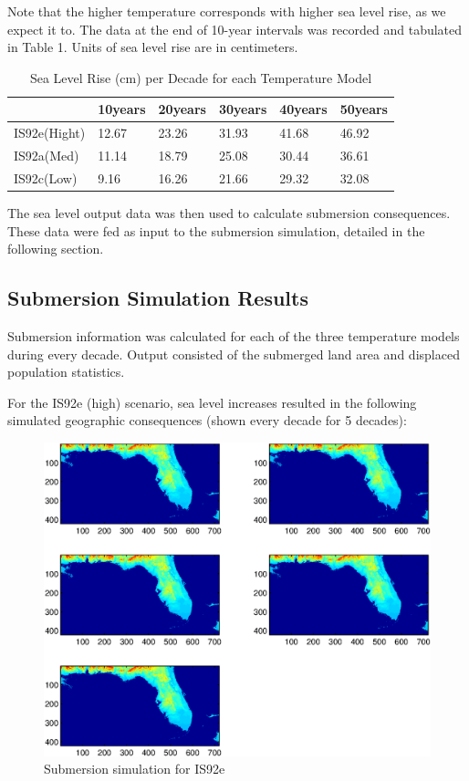\documentclass[12pt,a4paper,titlepage]{article}
\begin{document}
Note that the higher temperature corresponds with higher sea level
rise, as we expect it to. The data at the end of 10-year intervals
was recorded and tabulated in Table 1. Units of sea level rise are
in centimeters.

\begin{table}[!htb]
\centering \caption{Sea Level Rise (cm) per Decade for each
Temperature Model}
\begin{tabular}{|l|l|l|l|l|l|}
\hline
 & 10years & 20years & 30years & 40years & 50years \\
\hline
IS92e(Hight) & 12.67  & 23.26  & 31.93  & 41.68  & 46.92 \\
\hline
IS92a(Med) & 11.14        & 18.79    & 25.08  &     30.44  &    36.61  \\
\hline
IS92c(Low) & 9.16  & 16.26  & 21.66  & 29.32  & 32.08 \\
\hline
\end{tabular}
\end{table}

The sea level output data was then used to calculate submersion
consequences. These data were fed as input to the submersion
simulation, detailed in the following section.

\subsection{Submersion Simulation Results}

Submersion information was calculated for each of the three
temperature models during every decade. Output consisted of the
submerged land area and displaced population statistics.

For the IS92e (high) scenario, sea level increases resulted in the
following simulated geographic consequences (shown every decade
for 5 decades):

\begin{figure}[!htb]
\centering
\includegraphics[width=1\textwidth]{fig07.eps}
\caption{Submersion simulation for IS92e}
\end{figure}
\end{document}
